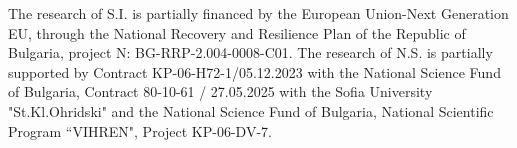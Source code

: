 \documentclass[10pt,british]{article}
\begin{document}
The research of S.I.  is partially  financed by the European Union-Next Generation EU, through the National Recovery and Resilience Plan of the Republic of Bulgaria, project N:%
BG-RRP-2.004-0008-C01. The research of N.S.  is partially supported   by Contract KP-06-H72-1/05.12.2023 with the National Science Fund of Bulgaria, Contract 80-10-61 / 27.05.2025   with the Sofia University "St.Kl.Ohridski" and  the National Science Fund of Bulgaria, National Scientific Program ``VIHREN", Project KP-06-DV-7.



\vskip 0.5cm
\end{document}
